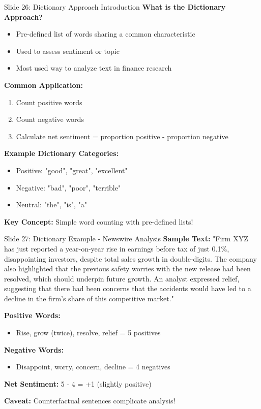 \documentclass[8pt]{beamer}
\begin{document}
	\begin{frame}{Slide 26: Dictionary Approach Introduction}
		\fontsize{6.5}{7.5}\selectfont
		\textbf{What is the Dictionary Approach?}
		\begin{itemize}
			\item Pre-defined list of words sharing a common characteristic
			\item Used to assess sentiment or topic
			\item Most used way to analyze text in finance research
		\end{itemize}
		
		\vspace{0.1cm}
		\textbf{Common Application:}
		\begin{enumerate}
			\item Count positive words
			\item Count negative words
			\item Calculate net sentiment = proportion positive - proportion negative
		\end{enumerate}
		
		\vspace{0.1cm}
		\textbf{Example Dictionary Categories:}
		\begin{itemize}
			\item Positive: "good", "great", "excellent"
			\item Negative: "bad", "poor", "terrible"
			\item Neutral: "the", "is", "a"
		\end{itemize}
		
		\textcolor{myblue}{\textbf{Key Concept:}} Simple word counting with pre-defined lists!
	\end{frame}
	
	\begin{frame}{Slide 27: Dictionary Example - Newswire Analysis}
		\fontsize{6.5}{7.5}\selectfont
		\textbf{Sample Text:}
		"Firm XYZ has just reported a year-on-year rise in earnings before tax of just 0.1\%, disappointing investors, despite total sales growth in double-digits. The company also highlighted that the previous safety worries with the new release had been resolved, which should underpin future growth. An analyst expressed relief, suggesting that there had been concerns that the accidents would have led to a decline in the firm's share of this competitive market."
		
		\vspace{0.1cm}
		\textbf{Positive Words:}
		\begin{itemize}
			\item Rise, grow (twice), resolve, relief = 5 positives
		\end{itemize}
		
		\textbf{Negative Words:}
		\begin{itemize}
			\item Disappoint, worry, concern, decline = 4 negatives
		\end{itemize}
		
		\textbf{Net Sentiment:} 5 - 4 = +1 (slightly positive)
		
		\textcolor{myblue}{\textbf{Caveat:}} Counterfactual sentences complicate analysis!
	\end{frame}
	
\end{document}
